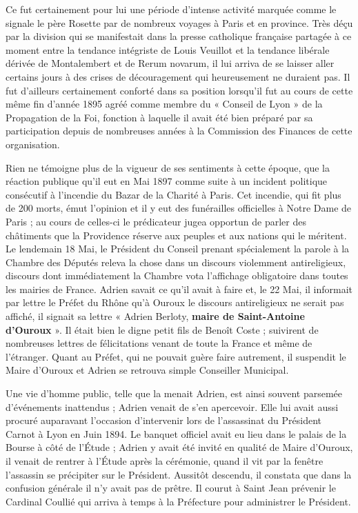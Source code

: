 \documentclass[11pt,a4paper]{report}
\begin{document}

Ce fut certainement pour lui une période d'intense activité marquée comme le signale le père Rosette par de nombreux voyages à Paris et en province. Très déçu par la division qui se manifestait dans la presse catholique française partagée à ce moment entre la tendance intégriste de Louis Veuillot et la tendance libérale dérivée de Montalembert et de Rerum novarum, il lui arriva de se laisser aller certains jours à des crises de découragement qui heureusement ne duraient pas. Il fut d'ailleurs certainement conforté dans sa position lorsqu'il fut au cours de cette même fin d'année 1895 agréé comme membre du « Conseil de Lyon » de la Propagation de la Foi, fonction à laquelle il avait été bien préparé par sa participation depuis de nombreuses années à la Commission des Finances de cette organisation.

Rien ne témoigne plus de la vigueur de ses sentiments à cette époque, que la réaction publique qu'il eut en Mai 1897 comme suite à un incident politique consécutif à l'incendie du Bazar de la Charité à Paris. Cet incendie, qui fit plus de 200 morts, émut l'opinion et il y eut des funérailles officielles à Notre Dame de Paris ; au cours de celles-ci le prédicateur jugea opportun de parler des châtiments que la Providence réserve aux peuples et aux nations qui le méritent. Le lendemain 18 Mai, le Président du Conseil prenant spécialement la parole à la Chambre des Députés releva la chose dans un discours violemment antireligieux, discours dont immédiatement la Chambre vota l'affichage obligatoire dans toutes les mairies de France. Adrien savait ce qu'il avait à faire et, le 22 Mai, il informait par lettre le Préfet du Rhône qu'à Ouroux le discours antireligieux ne serait pas affiché, il signait sa lettre « Adrien Berloty, \textbf{maire de Saint-Antoine d'Ouroux} ». Il était bien le digne petit fils de Benoît Coste ; suivirent de nombreuses lettres de félicitations venant de toute la France et même de l'étranger. Quant au Préfet, qui ne pouvait guère faire autrement, il suspendit le Maire d'Ouroux et Adrien se retrouva simple Conseiller Municipal.

Une vie d'homme public, telle que la menait Adrien, est ainsi souvent parsemée d'événements inattendus ; Adrien venait de s'en apercevoir. Elle lui avait aussi procuré auparavant l'occasion d'intervenir lors de l'assassinat du Président Carnot à Lyon en Juin 1894. Le banquet officiel avait eu lieu dans le palais de la Bourse à côté de l'Étude ; Adrien y avait été invité en qualité de Maire d'Ouroux, il venait de rentrer à l'Étude après la cérémonie, quand il vit par la fenêtre l'assassin se précipiter sur le Président. Aussitôt descendu, il constata que dans la confusion générale il n'y avait pas de prêtre. Il courut à Saint Jean prévenir le Cardinal Coullié qui arriva à temps à la Préfecture pour administrer le Président.
\end{document}
